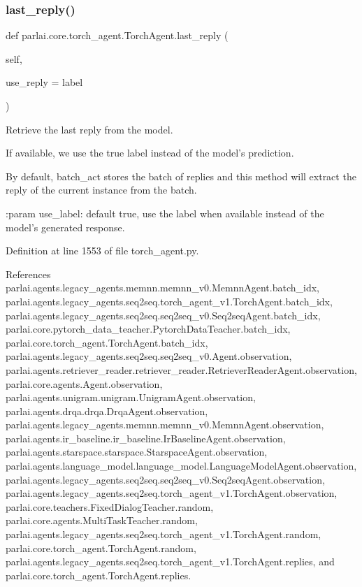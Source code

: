 \subsubsection{\texorpdfstring{last\+\_\+reply()}{last\_reply()}}
{\footnotesize\ttfamily def parlai.\+core.\+torch\+\_\+agent.\+Torch\+Agent.\+last\+\_\+reply (\begin{DoxyParamCaption}\item[{}]{self,  }\item[{}]{use\+\_\+reply = {\ttfamily \textquotesingle{}label\textquotesingle{}} }\end{DoxyParamCaption})}

\begin{DoxyVerb}Retrieve the last reply from the model.

If available, we use the true label instead of the model's prediction.

By default, batch_act stores the batch of replies and this method
will extract the reply of the current instance from the batch.

:param use_label:
    default true, use the label when available instead of the model's
    generated response.
\end{DoxyVerb}
 

Definition at line 1553 of file torch\+\_\+agent.\+py.



References parlai.\+agents.\+legacy\+\_\+agents.\+memnn.\+memnn\+\_\+v0.\+Memnn\+Agent.\+batch\+\_\+idx, parlai.\+agents.\+legacy\+\_\+agents.\+seq2seq.\+torch\+\_\+agent\+\_\+v1.\+Torch\+Agent.\+batch\+\_\+idx, parlai.\+agents.\+legacy\+\_\+agents.\+seq2seq.\+seq2seq\+\_\+v0.\+Seq2seq\+Agent.\+batch\+\_\+idx, parlai.\+core.\+pytorch\+\_\+data\+\_\+teacher.\+Pytorch\+Data\+Teacher.\+batch\+\_\+idx, parlai.\+core.\+torch\+\_\+agent.\+Torch\+Agent.\+batch\+\_\+idx, parlai.\+agents.\+legacy\+\_\+agents.\+seq2seq.\+seq2seq\+\_\+v0.\+Agent.\+observation, parlai.\+agents.\+retriever\+\_\+reader.\+retriever\+\_\+reader.\+Retriever\+Reader\+Agent.\+observation, parlai.\+core.\+agents.\+Agent.\+observation, parlai.\+agents.\+unigram.\+unigram.\+Unigram\+Agent.\+observation, parlai.\+agents.\+drqa.\+drqa.\+Drqa\+Agent.\+observation, parlai.\+agents.\+legacy\+\_\+agents.\+memnn.\+memnn\+\_\+v0.\+Memnn\+Agent.\+observation, parlai.\+agents.\+ir\+\_\+baseline.\+ir\+\_\+baseline.\+Ir\+Baseline\+Agent.\+observation, parlai.\+agents.\+starspace.\+starspace.\+Starspace\+Agent.\+observation, parlai.\+agents.\+language\+\_\+model.\+language\+\_\+model.\+Language\+Model\+Agent.\+observation, parlai.\+agents.\+legacy\+\_\+agents.\+seq2seq.\+seq2seq\+\_\+v0.\+Seq2seq\+Agent.\+observation, parlai.\+agents.\+legacy\+\_\+agents.\+seq2seq.\+torch\+\_\+agent\+\_\+v1.\+Torch\+Agent.\+observation, parlai.\+core.\+teachers.\+Fixed\+Dialog\+Teacher.\+random, parlai.\+core.\+agents.\+Multi\+Task\+Teacher.\+random, parlai.\+agents.\+legacy\+\_\+agents.\+seq2seq.\+torch\+\_\+agent\+\_\+v1.\+Torch\+Agent.\+random, parlai.\+core.\+torch\+\_\+agent.\+Torch\+Agent.\+random, parlai.\+agents.\+legacy\+\_\+agents.\+seq2seq.\+torch\+\_\+agent\+\_\+v1.\+Torch\+Agent.\+replies, and parlai.\+core.\+torch\+\_\+agent.\+Torch\+Agent.\+replies.



